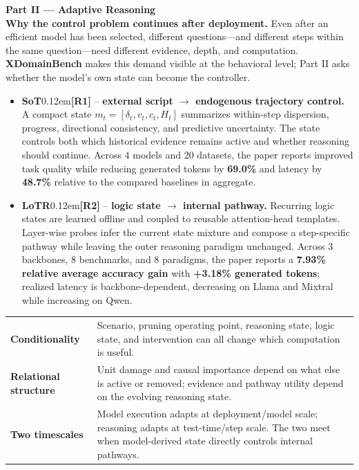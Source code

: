 \documentclass[11pt,a4paper]{article}
\newcommand{\method}[1]{{\sffamily\bfseries\color{MethodBlue}#1}}
\newcommand{\XDB}{\method{XDomainBench}}
\newcommand{\SoT}{\method{SoT}}
\newcommand{\LoTR}{\method{LoTR}}
\newcommand{\worktag}[1]{\kern0.12em\textcolor{NTUred}{\textsf{\bfseries\scriptsize[#1]}}}
\begin{document}
{\large\bfseries\color{NTUblue}Part II --- Adaptive Reasoning}\\[-0.7mm]
\textbf{Why the control problem continues after deployment.} Even after an efficient model has been selected, different questions---and different steps within the same question---need different evidence, depth, and computation. \XDB{} makes this demand visible at the behavioral level; Part II asks whether the model's own state can become the controller.

\begin{itemize}
\item \SoT{}\worktag{R1} -- \textbf{external script $\rightarrow$ endogenous trajectory control.} A compact state $m_t=[\delta_t,v_t,c_t,H_t]$ summarizes within-step dispersion, progress, directional consistency, and predictive uncertainty. The state controls both which historical evidence remains active and whether reasoning should continue. Across 4 models and 20 datasets, the paper reports improved task quality while reducing generated tokens by \textbf{69.0\%} and latency by \textbf{48.7\%} relative to the compared baselines in aggregate.
\item \LoTR{}\worktag{R2} -- \textbf{logic state $\rightarrow$ internal pathway.} Recurring logic states are learned offline and coupled to reusable attention-head templates. Layer-wise probes infer the current state mixture and compose a step-specific pathway while leaving the outer reasoning paradigm unchanged. Across 3 backbones, 8 benchmarks, and 8 paradigms, the paper reports a \textbf{7.93\% relative average accuracy gain} with \textbf{+3.18\% generated tokens}; realized latency is backbone-dependent, decreasing on Llama and Mixtral while increasing on Qwen.
\end{itemize}

\begin{center}
\resizebox{0.94\textwidth}{!}{}
\end{center}
\vspace{-1.3mm}

\begin{smallbox}
\begin{tabularx}{\linewidth}{@{}p{2.75cm} X@{}}
\textbf{Conditionality} & Scenario, pruning operating point, reasoning state, logic state, and intervention can all change which computation is useful.\\
\textbf{Relational structure} & Unit damage and causal importance depend on what else is active or removed; evidence and pathway utility depend on the evolving reasoning state.\\
\textbf{Two timescales} & Model execution adapts at deployment/model scale; reasoning adapts at test-time/step scale. The two meet when model-derived state directly controls internal pathways.\\
\end{tabularx}
\end{smallbox}
\end{document}
